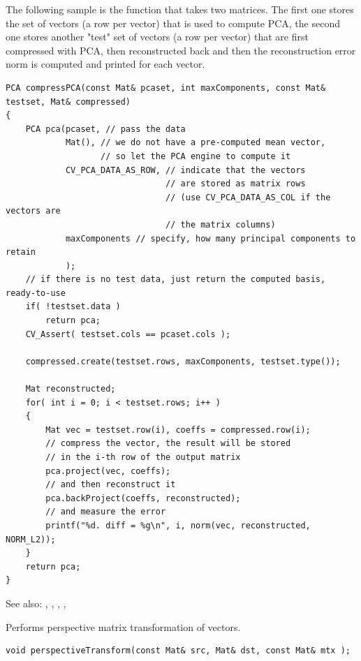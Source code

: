 The following sample is the function that takes two matrices. The first one stores the set of vectors (a row per vector) that is used to compute PCA, the second one stores another "test" set of vectors (a row per vector) that are first compressed with PCA, then reconstructed back and then the reconstruction error norm is computed and printed for each vector.
\begin{lstlisting}
PCA compressPCA(const Mat& pcaset, int maxComponents, const Mat& testset, Mat& compressed)
{
    PCA pca(pcaset, // pass the data
            Mat(), // we do not have a pre-computed mean vector,
                   // so let the PCA engine to compute it
            CV_PCA_DATA_AS_ROW, // indicate that the vectors
                                // are stored as matrix rows
                                // (use CV_PCA_DATA_AS_COL if the vectors are
                                // the matrix columns)
            maxComponents // specify, how many principal components to retain
            );
    // if there is no test data, just return the computed basis, ready-to-use
    if( !testset.data )
        return pca;
    CV_Assert( testset.cols == pcaset.cols );

    compressed.create(testset.rows, maxComponents, testset.type());

    Mat reconstructed;
    for( int i = 0; i < testset.rows; i++ )
    {
        Mat vec = testset.row(i), coeffs = compressed.row(i);
        // compress the vector, the result will be stored
        // in the i-th row of the output matrix
        pca.project(vec, coeffs);
        // and then reconstruct it
        pca.backProject(coeffs, reconstructed);
        // and measure the error
        printf("%d. diff = %g\n", i, norm(vec, reconstructed, NORM_L2));
    }
    return pca;
}
\end{lstlisting}

See also: , , , , 

\label{perspectiveTransform}
Performs perspective matrix transformation of vectors.

\begin{lstlisting}
void perspectiveTransform(const Mat& src, Mat& dst, const Mat& mtx );
\end{lstlisting}
\begin{description}
\end{description}

